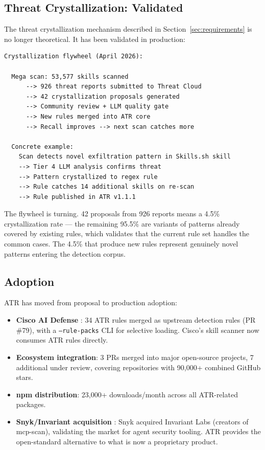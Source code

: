 \documentclass[11pt,letterpaper]{article}
\begin{document}
\subsection{Threat Crystallization: Validated}

The threat crystallization mechanism described in Section~\ref{sec:requirements} is no longer theoretical. It has been validated in production:

\begin{lstlisting}
Crystallization flywheel (April 2026):

  Mega scan: 53,577 skills scanned
      --> 926 threat reports submitted to Threat Cloud
      --> 42 crystallization proposals generated
      --> Community review + LLM quality gate
      --> New rules merged into ATR core
      --> Recall improves --> next scan catches more

  Concrete example:
    Scan detects novel exfiltration pattern in Skills.sh skill
    --> Tier 4 LLM analysis confirms threat
    --> Pattern crystallized to regex rule
    --> Rule catches 14 additional skills on re-scan
    --> Rule published in ATR v1.1.1
\end{lstlisting}

The flywheel is turning. 42 proposals from 926 reports means a 4.5\% crystallization rate --- the remaining 95.5\% are variants of patterns already covered by existing rules, which validates that the current rule set handles the common cases. The 4.5\% that produce new rules represent genuinely novel patterns entering the detection corpus.


\subsection{Adoption}

ATR has moved from proposal to production adoption:

\begin{itemize}
\item \textbf{Cisco AI Defense} \cite{ciscopr79}: 34 ATR rules merged as upstream detection rules (PR \#79), with a \texttt{--rule-packs} CLI for selective loading. Cisco's skill scanner now consumes ATR rules directly.
\item \textbf{Ecosystem integration}: 3 PRs merged into major open-source projects, 7 additional under review, covering repositories with 90,000+ combined GitHub stars.
\item \textbf{npm distribution}: 23,000+ downloads/month across all ATR-related packages.
\item \textbf{Snyk/Invariant acquisition} \cite{snykinvariant}: Snyk acquired Invariant Labs (creators of mcp-scan), validating the market for agent security tooling. ATR provides the open-standard alternative to what is now a proprietary product.
\end{itemize}
\end{document}
